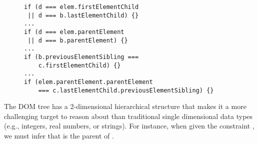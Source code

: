 \begin{figure}[t]
\begin{lstlisting}[caption=Example code showing how DOM operations can have logical constraints that are interdependent with each other: {\tt line 3} and {\tt line 6}.  To make all these {\tt if} statements {\tt true} the sub conditions in {\tt line 3} and {\tt line 6} become mutually exclusive: they cannot be {\tt true} at the same time because {\tt d} cannot be both a parent and a child of the same DOM element {\tt elem}.   Note that the final 2 conditions ({\tt line 9} and {\tt line 12}) would collectively influence the DOM solver to decide which sub condition ({\tt line 3} vs. {\tt line 6}) to become {\tt true}.,label=domOr]  
if (d === elem.firstElementChild
 || d === b.lastElementChild) {}
... 
if (d === elem.parentElement
 || d === b.parentElement) {}
...
if (b.previousElementSibling === 
    c.firstElementChild) {}
... 
if (elem.parentElement.parentElement 
    === c.lastElementChild.previousElementSibling) {}  
\end{lstlisting}
\end{figure}


The DOM tree has a 2-dimensional hierarchical structure that makes it a more challenging target to reason about than traditional single dimensional data types (e.g., integers, real numbers, or strings). 
For instance, when given the constraint , we must infer that  is the parent of . 



